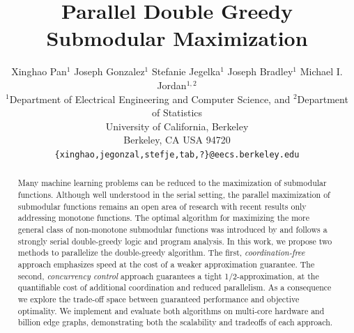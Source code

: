\documentclass{article} %
\title{Parallel Double Greedy Submodular Maximization}
\author{
Xinghao Pan$^1$ Joseph Gonzalez$^1$ Stefanie Jegelka$^1$ Joseph Bradley$^{1}$ Michael I. Jordan$^{1,2}$\\
$^1$Department of Electrical Engineering and Computer Science, and $^2$Department of Statistics\\
University of California, Berkeley\\
Berkeley, CA USA 94720\\
  \texttt{\{xinghao,jegonzal,stefje,tab,?\}@eecs.berkeley.edu} \\
}
\begin{document}
\maketitle


\begin{abstract}
Many machine learning problems can be reduced to the maximization of  submodular functions.
Although well understood in the serial setting, the parallel maximization of submodular functions remains an open area of research with recent results \cite{Mirzasoleiman2013} only addressing monotone functions.
The optimal algorithm for maximizing the more general class of non-monotone submodular functions was introduced by \citet{buchbinder2012} and follows a strongly serial double-greedy logic and program analysis.
In this work, we propose two methods to parallelize the double-greedy algorithm.
The first, \emph{coordination-free} approach emphasizes speed at the cost of a weaker approximation guarantee.
The second, \emph{concurrency control} approach guarantees a tight 1/2-approximation, at the quantifiable cost of additional coordination and reduced parallelism.
As a consequence we explore the trade-off space between guaranteed performance and objective optimality.
We implement and evaluate both algorithms on multi-core hardware and billion edge graphs, demonstrating both the scalability and tradeoffs of each approach.
%
%


\end{abstract}
\end{document}
